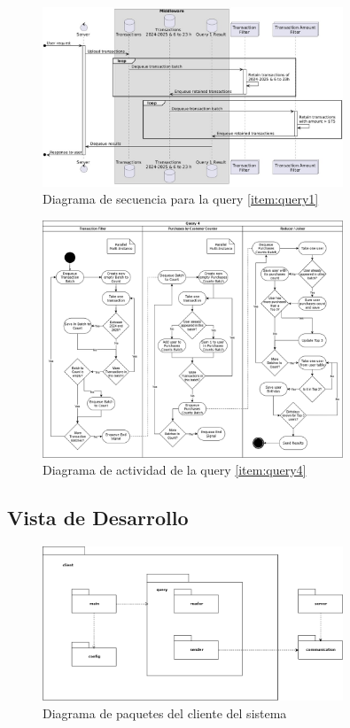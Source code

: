 \begin{figure}[H]
    \centering
    \includegraphics[width=0.8\textwidth]{imagenes/vistas/secuencia2.jpg}
    \caption{Diagrama de secuencia para la query \ref{item:query1}}
    \label{fig:secuencia2}
\end{figure}

\begin{figure}[H]
    \centering
    \includegraphics[width=0.8\textwidth]{imagenes/vistas/actividad.png}
    \caption{Diagrama de actividad de la query \ref{item:query4}}
    \label{fig:actividad}
\end{figure}



\subsection{Vista de Desarrollo}

\begin{figure}[H]
    \centering
    \includegraphics[width=0.8\textwidth]{imagenes/vistas/paquetes-client.png}
    \caption{Diagrama de paquetes del cliente del sistema}
    \label{fig:paquetes-client}
\end{figure}

